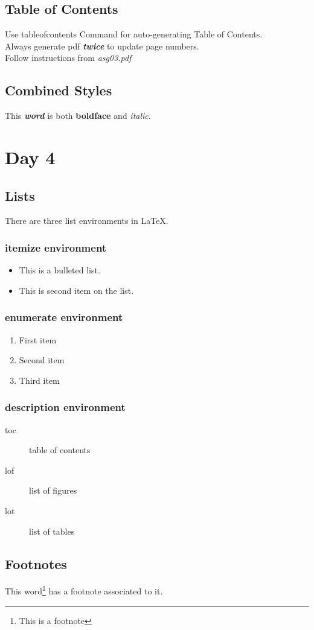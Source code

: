 \documentclass{article}
\begin{document}
\subsection{Table of Contents}
Use tableofcontents Command for auto-generating Table of Contents.\\
Always generate pdf \textbf{\textit{twice}} to update page numbers.\\
Follow instructions from \textit{asg03.pdf}

\subsection*{Combined Styles}
This \textbf{\textit{word}} is both \textbf{boldface} and \textit{italic}.

\section{Day 4}

\subsection{Lists}
There are three list environments in LaTeX.
\subsubsection*{itemize environment}
	\begin{itemize}
		\item This is a bulleted list.
		\item This is second item on the list.
	\end{itemize}

\subsubsection*{enumerate environment}
	\begin{enumerate}
		\item First item
		\item Second item
		\item Third item
	\end{enumerate}

\subsubsection*{description environment}
	\begin{description}
		\item[toc] table of contents
		\item[lof] list of figures
		\item[lot] list of tables
	\end{description}

\subsection{Footnotes}
This word\footnote{This is a footnote} has a footnote associated to it.

%
%
\end{document}
